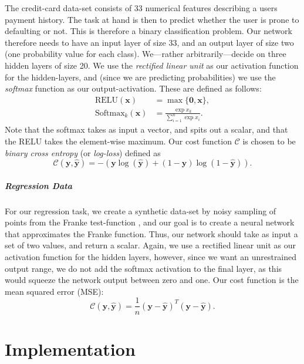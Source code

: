 \documentclass[a4paper, 11pt, oneside, article]{memoir}
\newcommand{\y}{\bm{y}}
\newcommand{\yhat}{\hat{\bm{y}}}
\newcommand{\mat}[1]{\bm{#1}}
\newcommand{\cost}{\mathcal{C}}
\begin{document}
	The credit-card data-set consists of 33 numerical features describing a
	users payment history.  The task at hand is then to predict whether the
	user is prone to defaulting or not. This is therefore a binary
	classification problem. Our network therefore needs to have an input
	layer of size 33, and an output layer of size two (one probability
	value for each class). We---rather arbitrarily---decide on three hidden
	layers of size 20. We use the \emph{rectified linear unit} as our
	activation function for the hidden-layers, and (since we are predicting
	probabilities) we use the \emph{softmax} function as our
	output-activation. These are defined as follows:
	\begin{align}
		\mathrm{RELU}(\mat{x}) &= \max\{\mat{0}, \mat{x}\}, \\
		\mathrm{Softmax}_k(\mat{x}) &= \frac{\exp{x_k}}{\sum_{i=1}^n \exp{x_i}}.
	\end{align}
	Note that the softmax takes as input a vector, and spits out a scalar,
	and that the RELU takes the element-wise maximum.
	Our cost function \( \cost \) is chosen to be \emph{binary cross
	entropy} (or \emph{log-loss}) defined as
	\begin{equation}
		\cost(\mat{y}, \yhat) = -(\mat{y} \log(\yhat) + (1 - \mat{y}) \log(1 - \yhat)).
	\end{equation}

	\paragraph{Regression Data}
		
	For our regression task, we create a synthetic data-set by noisy
	sampling of points from the Franke test-function
	\cite{frankeCriticalComparisonMethods1979}, and our goal is to create a
	neural network that approximates the Franke function. Thus, our network
	should take as input a set of two values, and return a scalar. Again,
	we use a rectified linear unit as our activation function for the
	hidden layers, however, since we want an unrestrained output range, we
	do not add the softmax activation to the final layer, as this would
	squeeze the network output between zero and one.  Our cost function is
	the mean squared error (MSE):
	\begin{equation}
		\cost(\mat{y}, \yhat) = \frac{1}{n} (\y - \yhat)^T (\y - \yhat).
	\end{equation}

	\chapter{Implementation}	
	
\end{document}
